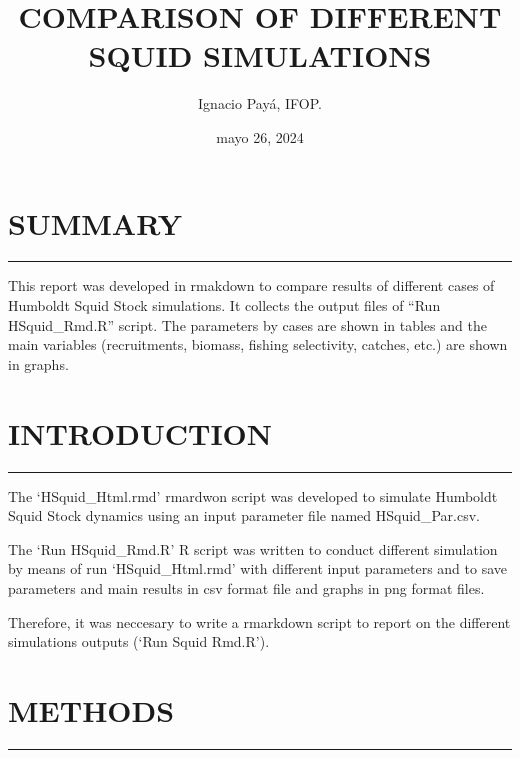 \documentclass[
]{article}
\title{COMPARISON OF DIFFERENT SQUID SIMULATIONS}
\author{Ignacio Payá, IFOP.}
\date{mayo 26, 2024}
\begin{document}
\maketitle

{
\setcounter{tocdepth}{2}
\tableofcontents
}
\hypertarget{section}{%
\subparagraph{}\label{section}}

\hypertarget{summary}{%
\section{SUMMARY}\label{summary}}

\begin{center}\rule{0.5\linewidth}{0.5pt}\end{center}

This report was developed in rmakdown to compare results of different
cases of Humboldt Squid Stock simulations. It collects the output files
of ``Run HSquid\_Rmd.R'' script. The parameters by cases are shown in
tables and the main variables (recruitments, biomass, fishing
selectivity, catches, etc.) are shown in graphs.

\hypertarget{introduction}{%
\section{INTRODUCTION}\label{introduction}}

\begin{center}\rule{0.5\linewidth}{0.5pt}\end{center}

The `HSquid\_Html.rmd' rmardwon script was developed to simulate
Humboldt Squid Stock dynamics using an input parameter file named
HSquid\_Par.csv.

The `Run HSquid\_Rmd.R' R script was written to conduct different
simulation by means of run `HSquid\_Html.rmd' with different input
parameters and to save parameters and main results in csv format file
and graphs in png format files.

Therefore, it was neccesary to write a rmarkdown script to report on the
different simulations outputs (`Run Squid Rmd.R').

\hypertarget{methods}{%
\section{METHODS}\label{methods}}

\begin{center}\rule{0.5\linewidth}{0.5pt}\end{center}
\end{document}

